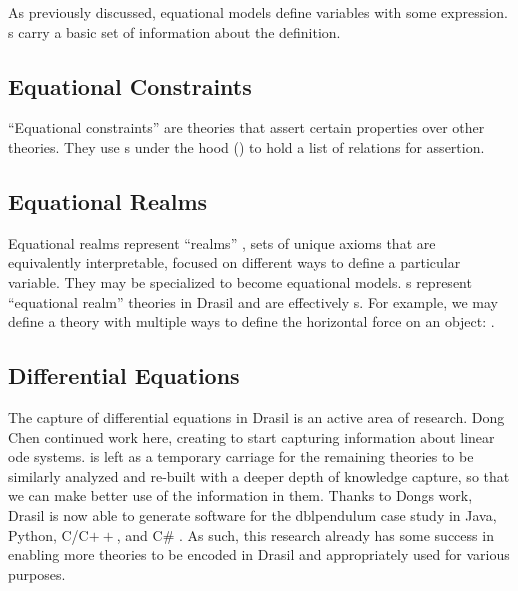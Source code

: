 As previously discussed, equational models define variables with some
expression. \QDefinition{}s carry a basic set of information about the
definition.

\currentLandPosIMHaskell{}

\currentQDefinitionHaskell{}

\subsection{Equational Constraints}
\label{chap:more-theory-kinds:sec:classify-all-the-theories:subsec:equational-constraints}

``Equational constraints'' are theories that assert certain properties over
other theories. They use \ConstraintSet{}s under the hood
() to hold a list of relations for assertion.

\currentExampleEquationalConstraintsHaskell{}

\currentConstraintSetHaskell{}

\subsection{Equational Realms}
\label{chap:more-theory-kinds:sec:classify-all-the-theories:subsec:equational-realms}

Equational realms represent ``realms'' \cite{Carette2014realms}, sets of unique axioms that are equivalently
interpretable, focused on different ways to define a particular variable. They
may be specialized to become equational models. \EquationalRealm{}s represent
``equational realm'' theories in Drasil and are effectively \MultiDefn{}s. For
example, we may define a theory with multiple ways to define the horizontal
force on an object: .

\currentExampleEquationalRealmHaskell{}

\currentMultiDefnHaskell{}

\currentDefiningExprHaskell{}

\subsection{Differential Equations}
\label{chap:more-theory-kinds:sec:classify-all-the-theories:subsec:differential-equations}

The capture of differential equations in Drasil is an active area of research.
Dong Chen continued work here, creating \NewDEModel{} \cite{Chen2022MEng} to
start capturing information about linear \acs{ode} systems. \DEModel{} is left
as a temporary carriage for the remaining theories to be similarly analyzed and
re-built with a deeper depth of knowledge capture, so that we can make better
use of the information in them. Thanks to Dongs work, Drasil is now able to
generate software for the \acs{dblpendulum} case study in Java, Python, C/C$++$,
and C\# \cite{Chen2022MEng}. As such, this research already has some success in
enabling more theories to be encoded in Drasil and appropriately used for
various purposes.


